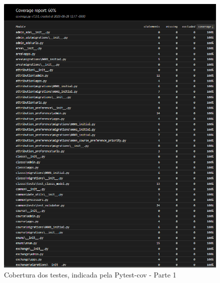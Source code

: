 \documentclass[12pt]{article}
\begin{document}
\begin{figure}[h]
    \centering
    \includegraphics[width=1\textwidth]{coberturaparte1.png}
    \caption{Cobertura dos testes, indicada pela Pytest-cov - Parte 1}
    \label{fig:cobertura1}
\end{figure}
\end{document}
